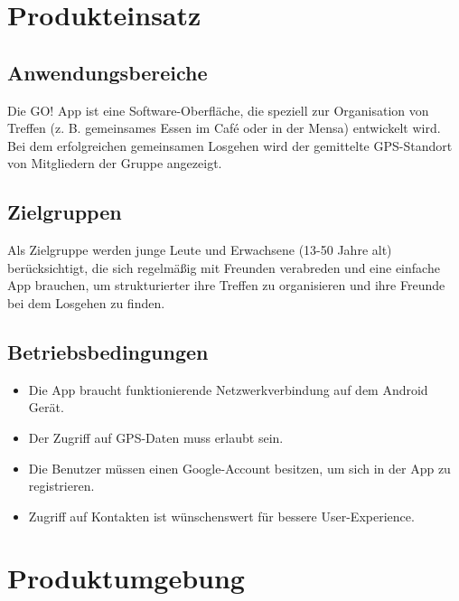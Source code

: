 \documentclass[parskip=full]{scrartcl}
\begin{document}
\newpage
\section{Produkteinsatz}
\subsection{Anwendungsbereiche}
Die GO! App ist eine Software-Oberfläche, die speziell zur Organisation von Treffen (z. B. gemeinsames Essen im Café oder in der Mensa) entwickelt wird. Bei dem erfolgreichen gemeinsamen Losgehen wird der gemittelte GPS-Standort von Mitgliedern der Gruppe angezeigt.
 
\subsection{Zielgruppen}
Als Zielgruppe werden junge Leute und Erwachsene (13-50 Jahre alt) berücksichtigt, die sich regelmäßig mit Freunden verabreden und eine einfache App brauchen, um strukturierter ihre Treffen zu organisieren und ihre Freunde bei dem Losgehen zu finden.

\subsection{Betriebsbedingungen}\label{Betriebsbedingungen}
\begin{itemize}
	\item Die App braucht funktionierende Netzwerkverbindung auf dem Android Gerät.\\
	\item Der Zugriff auf GPS-Daten muss erlaubt sein.\\
	\item Die Benutzer müssen einen Google-Account besitzen, um sich in der App zu registrieren.\\
	\item Zugriff auf Kontakten ist wünschenswert für bessere User-Experience. %
\end{itemize}

\newpage
\section{Produktumgebung}
\end{document}
